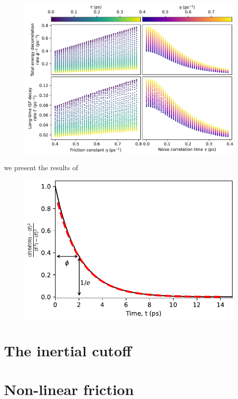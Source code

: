 \documentclass[7pt]{article}
\begin{document}
\begin{figure}
	\centering
	\includegraphics[width=1.0\textwidth]{eta_tau_ttf_gamma}
	\caption{}
	\label{fig:eta_tau_ttf_gamma}
\end{figure}

 we present the results of  
\begin{figure}
	\centering
	\includegraphics[width=1.0\columnwidth]{e_auto}
	\caption{}
	\label{fig:e_auto}
\end{figure}

\section*{The inertial cutoff}

\section*{Non-linear friction}
\end{document}
